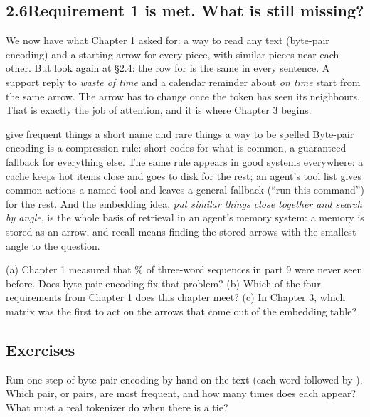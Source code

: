 \subsection*{2.6\quad Requirement 1 is met. What is still missing?}

We now have what Chapter 1 asked for: a way to read any text (byte-pair encoding) and a starting arrow for
every piece, with similar pieces near each other. But look again at \S2.4: the row for  is the
same in every sentence. A support reply to \emph{waste of time} and a calendar reminder about \emph{on time}
start from the same arrow. The arrow has to change once the token has seen its neighbours. That is
exactly the job of attention, and it is where Chapter 3 begins.

\begin{principle}{give frequent things a short name and rare things a way to be spelled}
Byte-pair encoding is a compression rule: short codes for what is common, a guaranteed fallback for
everything else. The same rule appears in good systems everywhere: a cache keeps hot items close and goes
to disk for the rest; an agent's tool list gives common actions a named tool and leaves a general
fallback (``run this command'') for the rest. And the embedding idea, \emph{put similar things close
together and search by angle}, is the whole basis of retrieval in an agent's memory system: a memory is
stored as an arrow, and recall means finding the stored arrows with the smallest angle to the question.
\end{principle}

\begin{lookingback}
(a) Chapter 1 measured that \cUnseenThree\% of three-word sequences in part 9 were never seen before.
Does byte-pair encoding fix that problem? (b) Which of the four requirements from Chapter 1 does this
chapter meet? (c) In Chapter 3, which matrix was the first to act on the arrows that come out of the
embedding table?
\end{lookingback}

\subsection*{Exercises}

\begin{exercise}
Run one step of byte-pair encoding by hand on the text  (each word followed
by \tok{\_}). Which pair, or pairs, are most frequent, and how many times does each appear? What must a real
tokenizer do when there is a tie?
\end{exercise}

